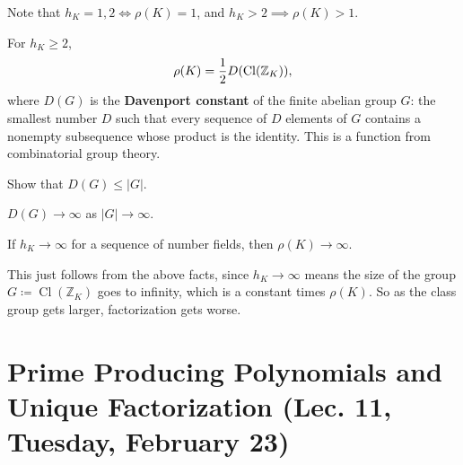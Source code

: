 \begin{remark}

Note that \(h_K = 1, 2\iff \rho(K) = 1\), and
\(h_K > 2 \implies \rho(K) > 1\).

\end{remark}

\begin{theorem}

For \(h_K \geq 2\),
\begin{align*}
\rho(K) = {1\over 2} D( { \operatorname{Cl}} ( {\mathbb{Z}}_K))
,\end{align*}
where \(D(G)\) is the \textbf{Davenport constant} of the finite abelian
group \(G\): the smallest number \(D\) such that every sequence of \(D\)
elements of \(G\) contains a nonempty subsequence whose product is the
identity. This is a function from combinatorial group theory.

\end{theorem}

\begin{exercise}

Show that \(D(G) \leq {\left\lvert {G} \right\rvert}\).

\end{exercise}

\begin{fact}

\(D(G) \to \infty\) as \({\left\lvert {G} \right\rvert} \to \infty\).

\end{fact}

\begin{corollary}[?]

If \(h_K \to \infty\) for a sequence of number fields, then
\(\rho(K) \to \infty\).

\end{corollary}

\begin{remark}

This just follows from the above facts, since \(h_K \to \infty\) means
the size of the group
\(G \coloneqq{ \operatorname{Cl}} ( {\mathbb{Z}}_K)\) goes to infinity,
which is a constant times \(\rho(K)\). So as the class group gets
larger, factorization gets worse.

\end{remark}

\hypertarget{prime-producing-polynomials-and-unique-factorization-lec.-11-tuesday-february-23}{%
\section{Prime Producing Polynomials and Unique Factorization (Lec. 11,
Tuesday, February
23)}\label{prime-producing-polynomials-and-unique-factorization-lec.-11-tuesday-february-23}}

